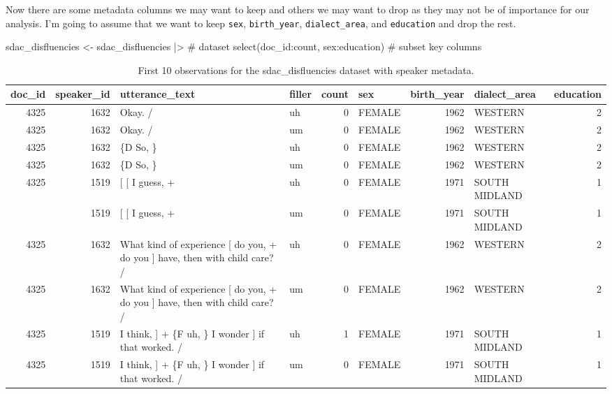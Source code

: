\documentclass[
  letterpaper,
]{latex/krantz}
\newenvironment{Shaded}{\begin{snugshade}}{\end{snugshade}}
\newcommand{\CommentTok}[1]{\textcolor[rgb]{0.37,0.37,0.37}{#1}}
\newcommand{\FunctionTok}[1]{\textcolor[rgb]{0.28,0.35,0.67}{#1}}
\newcommand{\NormalTok}[1]{\textcolor[rgb]{0.00,0.23,0.31}{#1}}
\newcommand{\OtherTok}[1]{\textcolor[rgb]{0.00,0.23,0.31}{#1}}
\newcommand{\SpecialCharTok}[1]{\textcolor[rgb]{0.37,0.37,0.37}{#1}}
\begin{document}
Now there are some metadata columns we may want to keep and others we
may want to drop as they may not be of importance for our analysis. I'm
going to assume that we want to keep \texttt{sex}, \texttt{birth\_year},
\texttt{dialect\_area}, and \texttt{education} and drop the rest.

\begin{Shaded}
\begin{Highlighting}[]
\NormalTok{sdac\_disfluencies }\OtherTok{\textless{}{-}} 
\NormalTok{  sdac\_disfluencies }\SpecialCharTok{|\textgreater{}} \CommentTok{\# dataset}
  \FunctionTok{select}\NormalTok{(doc\_id}\SpecialCharTok{:}\NormalTok{count, sex}\SpecialCharTok{:}\NormalTok{education) }\CommentTok{\# subset key columns}
\end{Highlighting}
\end{Shaded}

\hypertarget{tbl-td-sdac-disfluencies-meta-preview}{}
\begin{table}
\caption{\label{tbl-td-sdac-disfluencies-meta-preview}First 10 observations for the sdac\_disfluencies dataset with speaker
metadata. }\tabularnewline

\centering
\begin{tabular}{rrllrlrlr}
\toprule
doc\_id & speaker\_id & utterance\_text & filler & count & sex & birth\_year & dialect\_area & education\\
\midrule
4325 & 1632 & Okay.  / & uh & 0 & FEMALE & 1962 & WESTERN & 2\\
4325 & 1632 & Okay.  / & um & 0 & FEMALE & 1962 & WESTERN & 2\\
4325 & 1632 & \{D So, \} & uh & 0 & FEMALE & 1962 & WESTERN & 2\\
4325 & 1632 & \{D So, \} & um & 0 & FEMALE & 1962 & WESTERN & 2\\
4325 & 1519 & {}[ [ I guess, + & uh & 0 & FEMALE & 1971 & SOUTH MIDLAND & 1\\
\addlinespace
4325 & 1519 & {}[ [ I guess, + & um & 0 & FEMALE & 1971 & SOUTH MIDLAND & 1\\
4325 & 1632 & What kind of experience [ do you, + do you ] have, then with child care? / & uh & 0 & FEMALE & 1962 & WESTERN & 2\\
4325 & 1632 & What kind of experience [ do you, + do you ] have, then with child care? / & um & 0 & FEMALE & 1962 & WESTERN & 2\\
4325 & 1519 & I think, ] + \{F uh, \} I wonder ] if that worked. / & uh & 1 & FEMALE & 1971 & SOUTH MIDLAND & 1\\
4325 & 1519 & I think, ] + \{F uh, \} I wonder ] if that worked. / & um & 0 & FEMALE & 1971 & SOUTH MIDLAND & 1\\
\bottomrule
\end{tabular}
\end{table}
\end{document}
